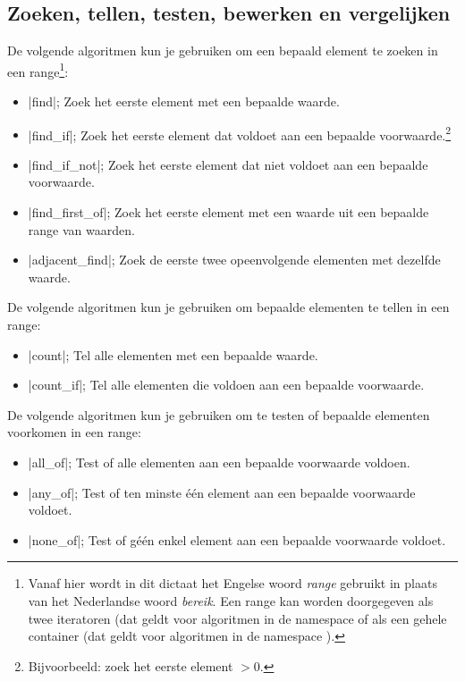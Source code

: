 \begin{cpplstShortInline}
\section{Zoeken, tellen, testen, bewerken en vergelijken}
\label{sec:algo1}
De volgende algoritmen kun je gebruiken om een bepaald element te zoeken in een range\footnote{%
	Vanaf hier wordt in dit dictaat het Engelse woord \emph{range} gebruikt in plaats van het Nederlandse woord \emph{bereik}.
	Een range kan worden doorgegeven als twee iteratoren (dat geldt voor algoritmen in de namespace  of als een gehele container (dat geldt voor algoritmen in de namespace ).
}:
\begin{itemize}
	\item |find|; Zoek het eerste element met een bepaalde waarde.
	\item |find_if|; Zoek het eerste element dat voldoet aan een bepaalde voorwaarde.\footnote{%
		Bijvoorbeeld: zoek het eerste element $>0$.
	}
	\item |find_if_not|; Zoek het eerste element dat niet voldoet aan een bepaalde voorwaarde.
	\item |find_first_of|\footnotemark{}; Zoek het eerste element met een waarde uit een bepaalde range van waarden.
	\item |adjacent_find|; Zoek de eerste twee opeenvolgende elementen met dezelfde waarde.
\end{itemize}

De volgende algoritmen kun je gebruiken om bepaalde elementen te tellen in een range:
\begin{itemize}
	\item |count|; Tel alle elementen met een bepaalde waarde.
	\item |count_if|; Tel alle elementen die voldoen aan een bepaalde voorwaarde.
\end{itemize}

De volgende algoritmen kun je gebruiken om te testen of bepaalde elementen voorkomen in een range:
\begin{itemize}
	\item |all_of|; Test of alle elementen aan een bepaalde voorwaarde voldoen.
	\item |any_of|; Test of ten minste één element aan een bepaalde voorwaarde voldoet.
	\item |none_of|; Test of géén enkel element aan een bepaalde voorwaarde voldoet.
\end{itemize}


\end{cpplstShortInline}
